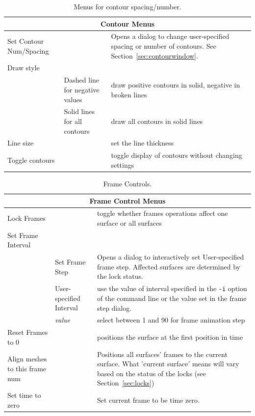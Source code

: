 \begin{table}[ht]
\caption{\label{table:contours}Menus for contour spacing/number.}
  \begin{center}
    \begin{tabular}{|l|l|p{3 in}|} \hline
      \multicolumn{3}{|c|}{\textbf{Contour Menus}} \\ \hline
    Set Contour Num/Spacing & & Opens a dialog to change user-specified 
    spacing or number of contours. See Section~\ref{sec:contourwindow}.
    \\ 
    Draw style & & \\
    & Dashed line for negative values & draw positive contours in solid,
    negative in broken lines\\
    & Solid lines for all contours & draw all contours in solid lines\\
    Line size & & set the line thickness \\ \hline
    Toggle contours & & toggle display of contours
    without changing settings \\ \hline
    \end{tabular}
  \end{center}
\end{table}

\begin{table}[ht]
\caption{Frame Controls.}
  \begin{center}
    \begin{tabular}{|l|l|p{2.8 in}|} \hline
      \multicolumn{3}{|c|}{\textbf{Frame Control Menus}} \\ \hline
    Lock Frames  & & toggle whether frames 
        operations affect one surface or all surfaces \\ \hline
    Set Frame Interval & & \\
      & Set Frame Step & Opens a dialog to interactively set User-specified 
    frame step.  Affected surfaces are determined by the lock status.\\
      & User-specified Interval & use the value of interval specified in the 
        \texttt{-i} option of the command line or the value set in the
        frame step dialog.\\ 
      & \emph{value} & select between 1 and 90 for frame animation step \\
    Reset Frames to 0 & & positions the surface at the first position in time
       \\
    Align meshes to this frame num & & Positions all surfaces' frames to the
    current surface.  What 'current surface' means will vary based on the status
    of the locks (see Section~\ref{sec:locks})
    \\
    Set time to zero & & Set current frame to be time zero.
        \\ \hline
    \end{tabular}
  \end{center}
\end{table}

